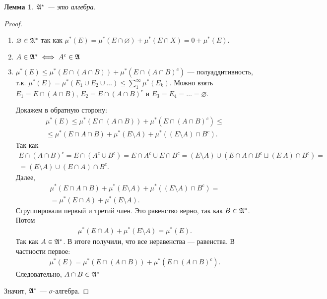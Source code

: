 \documentclass[a4paper,14pt]{extarticle}
\newcounter{theoremCnt}
\theoremstyle{definition}
\theoremstyle{plain}
\theoremstyle{plain}
\newtheorem{lm}[theoremCnt]{Лемма}
\theoremstyle{plain}
\theoremstyle{plain}
\theoremstyle{definition}
\theoremstyle{definition}
\theoremstyle{definition}
\theoremstyle{definition}
\theoremstyle{definition}
\theoremstyle{definition}
\theoremstyle{plain}
\theoremstyle{plain}
\theoremstyle{plain}
\theoremstyle{plain}
\theoremstyle{definition}
\theoremstyle{definition}
\theoremstyle{definition}
\theoremstyle{definition}
\theoremstyle{definition}
\newcommand{\A}{\ensuremath \mathfrak{A}}
\begin{document}
\begin{lm}
 $ \A^\ast $ --- это алгебра.
\end{lm}
\begin{proof}\
 \begin{enumerate}
  \item $ \varnothing \in \A^\ast $ так как $ \mu^\ast(E) = \mu^\ast(E \cap \varnothing) + \mu^\ast(E \cap X) = 0 + \mu^\ast(E) $.
   \setcounter{enumi}{2}
  \item $ A \in \A^\ast \iff A^c \in \A $
   \setcounter{enumi}{1}
  \item $ \mu^\ast(E) \leqslant \mu^\ast(E \cap (A \cap B)) + \mu^\ast(E \cap (A \cap B)^c) $ --- полуаддитивность, т.к. $ \mu^\ast(E) = \mu^\ast(E_1 \cup E_2 \cup \ldots) \leqslant \sum_1^\infty \mu^\ast(E_k)$. Можно взять $ E_1 = E \cap (A \cap B) $, $ E_2 = E \cap (A \cap B)^c $ и $ E_3 = E_4 = \ldots = \varnothing $.

   Докажем в обратную сторону:
   \begin{align*}
    \mu^\ast(E) \leqslant \mu^\ast(E \cap (A \cap B)) + \mu^\ast(E \cap (A \cap B)^c) \leqslant \\
    \leqslant \mu^\ast(E \cap A \cap B) + \mu^\ast(E \setminus A) + \mu^\ast((E \setminus A) \cap B^c)
   .\end{align*} Так как
   \begin{align*}
    E \cap (A \cap B)^c = E \cap (A^c \cup B^c) = E \cap A^c \cup E \cap B^c = (E \setminus A) \cup (E \cap A \cap B^c \sqcup (E \ A) \cap B^c) = \\
    = (E \setminus A) \cup (E \cap A) \cap B^c
   .\end{align*} Далее,
   \begin{align*}
    \mu^\ast(E \cap A \cap B) + \mu^\ast(E \setminus A) + \mu^\ast((E \setminus A) \cap B^c) = \\
    = \mu^\ast(E \cap A) + \mu^\ast(E \setminus A)
   .\end{align*} Сгруппировали первый и третий член. Это равенство верно, так как $ B \in \A^\ast $. Потом
   \begin{align*}
    \mu^\ast(E \cap A) + \mu^\ast(E \setminus A) = \mu^\ast(E)
   .\end{align*} Так как $ A \in \A^\ast $. В итоге получили, что все неравенства --- равенства. В частности первое:
   \begin{align*}
    \mu^\ast(E) = \mu^\ast(E \cap (A \cap B)) + \mu^\ast(E \cap (A \cap B)^c)
   .\end{align*} Следовательно, $ A \cap B \in \A^\ast $
 \end{enumerate}
 Значит, $ \A^\ast $ --- $ \sigma $-алгебра.
\end{proof}
\end{document}
